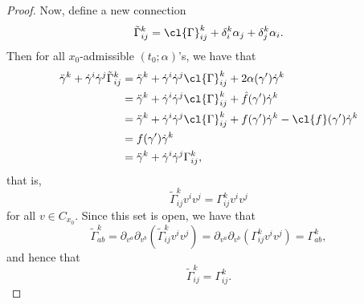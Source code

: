 \begin{proof}
Now, define a new connection
$$\tilde{\Gamma}_{ij}^k=\cl{\Gamma}_{ij}^k+\delta_i^k\alpha_j+\delta_j^k\alpha_i.$$
Then for all $x_0$-admissible $(t_0;\alpha)$'s, we have that
\begin{align*}
	\ddot{\gamma}^k+\dot{\gamma}^i\dot{\gamma}^j\tilde{\Gamma}_{ij}^k&=\ddot{\gamma}^k+\dot{\gamma}^i\dot{\gamma}^j\cl{\Gamma}_{ij}^k+2\alpha(\gamma')\dot{\gamma}^k\\
	&=\ddot{\gamma}^k+\dot{\gamma}^i\dot{\gamma}^j\cl{\Gamma}_{ij}^k+\hat{f}(\gamma')\dot{\gamma}^k\\
	&=\ddot{\gamma}^k+\dot{\gamma}^i\dot{\gamma}^j\cl{\Gamma}_{ij}^k+f(\gamma')\dot{\gamma}^k-\cl{f}(\gamma')\dot{\gamma}^k\\
	&=f(\gamma')\dot{\gamma}^k\\
	&=\ddot{\gamma}^k+\dot{\gamma}^i\dot{\gamma}^j\Gamma_{ij}^k,
\end{align*}
that is,
$$\tilde{\Gamma}_{ij}^kv^iv^j=\Gamma_{ij}^kv^iv^j$$
for all $v\in C_{x_0}$.  Since this set is open, we have that
$$\tilde{\Gamma}_{ab}^k=\partial_{v^a}\partial_{v^b}(\tilde{\Gamma}_{ij}^kv^iv^j)=\partial_{v^a}\partial_{v^b}(\Gamma_{ij}^kv^iv^j)=\Gamma_{ab}^k,$$
and hence that
$$\tilde{\Gamma}_{ij}^k=\Gamma_{ij}^k.$$

\end{proof}










